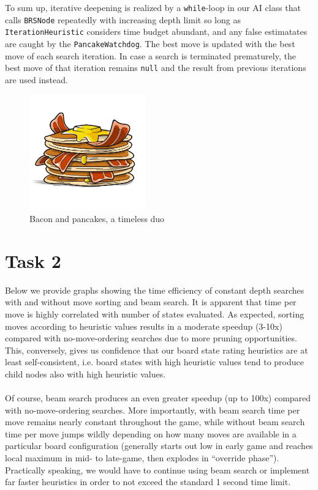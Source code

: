 \documentclass[a4paper,12pt]{article}
\begin{document}
To sum up, iterative deepening is realized by a \texttt{while}-loop in our AI class that calls \texttt{BRSNode} repeatedly with increasing depth limit so long as \texttt{IterationHeuristic} considers time budget abundant, and any false estimatates are caught by the \texttt{PancakeWatchdog}. The best move is updated with the best move of each search iteration. In case a search is terminated prematurely, the best move of that iteration remains \texttt{null} and the result from previous iterations are used instead.

\begin{figure}[H]
    \centering
    \includegraphics[height=5cm]{pictures/assignment4/pancakes_and_bacon.jpg}
    {\caption*{Bacon and pancakes, a timeless duo}}
    \label{fig:pancakes_and_bacon}
\end{figure}

\section{Task 2}
Below we provide graphs showing the time efficiency of constant depth searches with and without move sorting and beam search. It is apparent that time per move is highly correlated with number of states evaluated. As expected, sorting moves according to heuristic values results in a moderate speedup (3-10x) compared with no-move-ordering searches due to more pruning opportunities. This, conversely, gives us confidence that our board state rating heuristics are at least self-consistent, i.e. board states with high heuristic values tend to produce child nodes also with high heuristic values. \\ \\
Of course, beam search produces an even greater speedup (up to 100x) compared with no-move-ordering searches. More importantly, with beam search time per move remains nearly constant throughout the game, while without beam search time per move jumps wildly depending on how many moves are available in a particular board configuration (generally starts out low in early game and reaches local maximum in mid- to late-game, then explodes in ``override phase''). Practically speaking, we would have to continue using beam search or implement far faster heuristics in order to not exceed the standard 1 second time limit.





\end{document}
